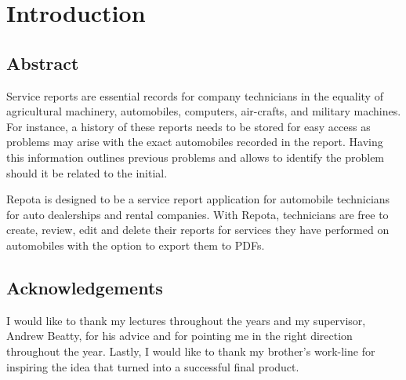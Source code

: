 \chapter{Introduction}

\section{Abstract}
Service reports are essential records for company technicians in the equality of agricultural machinery, automobiles, computers, air-crafts, and military machines. For instance, a history of these reports needs to be stored for easy access as problems may arise with the exact automobiles recorded in the report. Having this information outlines previous problems and allows to identify the problem should it be related to the initial. 

Repota is designed to be a service report application for automobile technicians for auto dealerships and rental companies. With Repota, technicians are free to create, review, edit and delete their reports for services they have performed on automobiles with the option to export them to PDFs.

\section{Acknowledgements}
 I would like to thank my lectures throughout the years and my supervisor, Andrew Beatty, for his advice and for pointing me in the right direction throughout the year. Lastly, I would like to thank my brother's work-line for inspiring the idea that turned into a successful final product.

